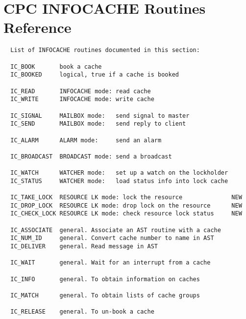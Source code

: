 \newpage
\part{CPC INFOCACHE Routines Reference}
\vspace*{1cm}
\begin{verbatim}
  List of INFOCACHE routines documented in this section:

  IC_BOOK       book a cache
  IC_BOOKED     logical, true if a cache is booked

  IC_READ       INFOCACHE mode: read cache
  IC_WRITE      INFOCACHE mode: write cache

  IC_SIGNAL     MAILBOX mode:   send signal to master
  IC_SEND       MAILBOX mode:   send reply to client

  IC_ALARM      ALARM mode:     send an alarm

  IC_BROADCAST  BROADCAST mode: send a broadcast

  IC_WATCH      WATCHER mode:   set up a watch on the lockholder
  IC_STATUS     WATCHER mode:   load status info into lock cache

  IC_TAKE_LOCK  RESOURCE LK mode: lock the resource              NEW
  IC_DROP_LOCK  RESOURCE LK mode: drop lock on the resource      NEW
  IC_CHECK_LOCK RESOURCE LK mode: check resource lock status     NEW

  IC_ASSOCIATE  general. Associate an AST routine with a cache
  IC_NUM_ID     general. Convert cache number to name in AST
  IC_DELIVER    general. Read message in AST

  IC_WAIT       general. Wait for an interrupt from a cache

  IC_INFO       general. To obtain information on caches

  IC_MATCH      general. To obtain lists of cache groups

  IC_RELEASE    general. To un-book a cache
\end{verbatim}

